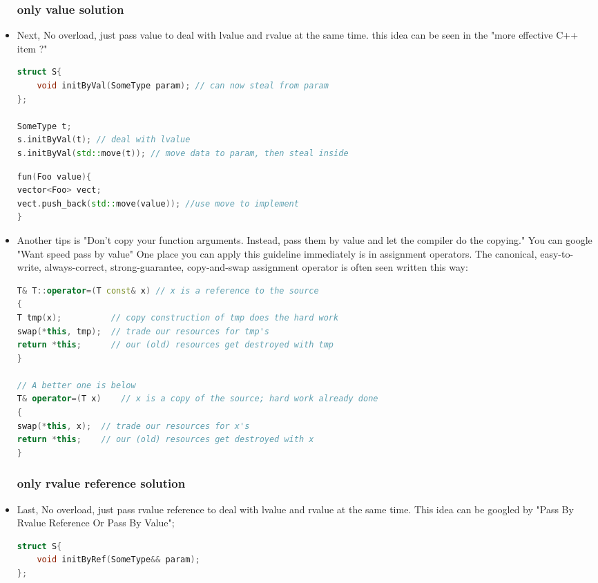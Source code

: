 \documentclass[a4paper,12pt,twoside]{book}
\begin{document}
\begin{itemize}
\subsubsection{only value solution}
\item Next, No overload, just pass value to deal with lvalue and rvalue at the same time. this idea can be seen in the "more effective C++ item ?"
\begin{lstlisting}[frame=single, language=c++]
struct S{
    void initByVal(SomeType param); // can now steal from param
};

SomeType t;
s.initByVal(t); // deal with lvalue 
s.initByVal(std::move(t)); // move data to param, then steal inside
\end{lstlisting}

\begin{lstlisting}[frame=single, language=c++]
fun(Foo value){
vector<Foo> vect;
vect.push_back(std::move(value)); //use move to implement
}
\end{lstlisting}



\item Another tips is "Don't copy your function arguments. Instead, pass them by value and let the compiler do the copying." You can google "Want speed pass by value" One place you can apply this guideline immediately is in assignment operators. The canonical, easy-to-write, always-correct, strong-guarantee, copy-and-swap assignment operator is often seen written this way:
\begin{lstlisting}[frame=single, language=c++]
T& T::operator=(T const& x) // x is a reference to the source
{ 
T tmp(x);          // copy construction of tmp does the hard work
swap(*this, tmp);  // trade our resources for tmp's
return *this;      // our (old) resources get destroyed with tmp 
}

// A better one is below
T& operator=(T x)    // x is a copy of the source; hard work already done
{
swap(*this, x);  // trade our resources for x's
return *this;    // our (old) resources get destroyed with x
}
\end{lstlisting}


\subsubsection{only rvalue  reference solution}
\item Last, No overload, just pass rvalue  reference to deal with lvalue and rvalue at the same time. This idea can be googled by "Pass By Rvalue Reference Or Pass By Value";
\begin{lstlisting}[frame=single, language=c++]
struct S{
    void initByRef(SomeType&& param);
};


\end{lstlisting}
\end{itemize}
\end{document}
